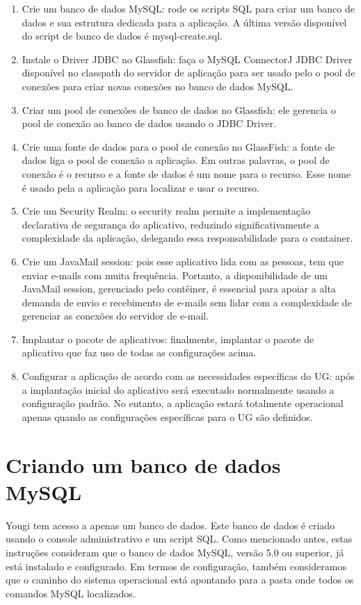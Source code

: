 \documentclass[envcountsame,envcountchap,letterpaper]{svmono}
\begin{document}
\begin{enumerate}
\item Crie um banco de dados MySQL: rode os scripts SQL para criar um banco de dados e sua estrutura dedicada para a aplicação. A última versão disponível do script de banco de dados é mysql-create.sql.
\item Instale o Driver JDBC no Glassfish: faça o MySQL ConnectorJ JDBC Driver disponível no classpath do servidor de aplicação para ser usado pelo o pool de conexões para criar novas conexões no banco de dados MySQL.
\item Criar um pool de conexões de banco de dados no Glassfish: ele gerencia o pool de conexão ao banco de dados usando o JDBC Driver.
\item Crie uma fonte de dados para o pool de conexão no GlassFish: a fonte de dados liga o pool de conexão a aplicação. Em outras palavras, o pool de conexão é o recurso e a fonte de dados é um nome para o recurso. Esse nome é usado pela a aplicação para localizar e usar o recurso.
\item Crie um Security Realm: o security realm permite a implementação declarativa de segurança do aplicativo, reduzindo significativamente a complexidade da aplicação, delegando essa responsabilidade para o container.
\item Crie um JavaMail session: pois esse aplicativo lida com as pessoas, tem que enviar e-mails com muita frequência. Portanto, a disponibilidade de um JavaMail session, gerenciado pelo contêiner, é essencial para apoiar a alta demanda de envio e recebimento de e-mails sem lidar com a complexidade de gerenciar as conexões do servidor de e-mail.
\item Implantar o pacote de aplicativos: finalmente, implantar o pacote de aplicativo que faz uso de todas as configurações acima.
\item Configurar a aplicação de acordo com as necessidades específicas do UG: após a implantação inicial do aplicativo será executado normalmente usando a configuração padrão. No entanto, a aplicação estará totalmente operacional apenas quando as configurações específicas para o UG são definidos.
\end{enumerate}

\section{Criando um banco de dados MySQL}

Yougi tem acesso a apenas um banco de dados. Este banco de dados é criado usando o console administrativo e um script SQL. Como mencionado antes, estas instruções consideram que o banco de dados MySQL, versão 5.0 ou superior, já está instalado e configurado. Em termos de configuração, também consideramos que o caminho do sistema operacional está apontando para a pasta onde todos os comandos MySQL localizados.
\end{document}
